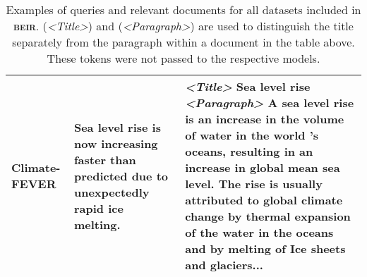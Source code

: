 \documentclass[11pt]{article}
\newcommand{\custo}[1]{\textsc{\normalsize #1}}
\newcommand{\beir}{\custo{beir}\xspace}
\begin{document}
\begin{table*}[t!]
{\begin{tabular}{l | l | l }
   Climate-FEVER & \multicolumn{1}{p{6cm}|}{Sea level rise is now increasing faster than predicted due to unexpectedly rapid ice melting.} & \multicolumn{1}{p{13cm}}{\textit{<Title>} Sea level rise \textit{<Paragraph>} A sea level rise is an increase in the volume of water in the world 's oceans, resulting in an increase in global mean sea level. The rise is usually attributed to global climate change by thermal expansion of the water in the oceans and by melting of Ice sheets and glaciers...}\\ \bottomrule
    \end{tabular}}
    \caption{Examples of queries and relevant documents for all datasets included in \textbf{\beir}. (\textit{<Title>}) and (\textit{<Paragraph>}) are used to distinguish the title separately from the paragraph within a document in the table above. These tokens were not passed to the respective models.}
    \label{tab:examples}
\end{table*}
\end{document}
